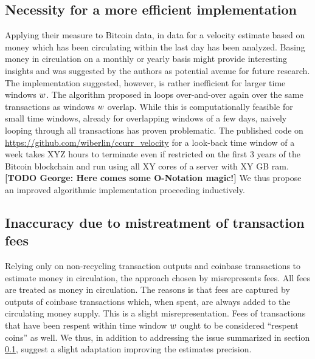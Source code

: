 \subsection{Necessity for a more efficient implementation}
\label{sec:necessity_effi}%
Applying their measure to Bitcoin data, in \cite{pernice2019cryptocurrencies} data for a velocity estimate based on money which has been circulating within the last day has been analyzed. %
Basing money in circulation on a monthly or yearly basis might provide interesting insights and was suggested by the authors as potential avenue for future research. %
The implementation suggested, however, is rather inefficient for larger time windows \({w}\). %
The algorithm proposed in \cite{pernice2019cryptocurrencies} loops over-and-over again over the same transactions as windows \({w}\) overlap. %
While this is computationally feasible for small time windows, already for overlapping windows of a few days, naively looping through all transactions has proven problematic. %
The published code on \url{https://github.com/wiberlin/ccurr_velocity} for a look-back time window of a week takes XYZ hours to terminate even if restricted on the first 3 years of the Bitcoin blockchain and run using all XY cores of a server with XY GB ram. 
\textbf{[TODO George: Here comes some O-Notation magic!]}
We thus propose an improved algorithmic implementation proceeding inductively. %

\subsection{Inaccuracy due to mistreatment of transaction fees}
\label{sec:inaccuracy_fees}%
Relying only on non-recycling transaction outputs and coinbase transactions to estimate money in circulation, the approach chosen by \cite{pernice2019cryptocurrencies} misrepresents fees. %
All fees are treated as money in circulation. %
The reasons is that fees are captured by outputs of coinbase transactions which, when spent, are always added to the circulating money supply. %
This is a slight misrepresentation. %
Fees of transactions that have been respent within time window \({w}\) ought to be considered ``respent coins'' as well. %
We thus, in addition to addressing the issue summarized in section \ref{sec:necessity_effi}, suggest a slight adaptation improving the estimates precision. %

